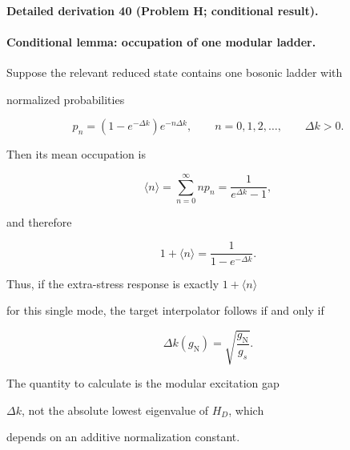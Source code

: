 \label{sec:status-H}



\paragraph{Detailed derivation 40 (Problem H; conditional result).} \label{ref:detail-39} %



\paragraph{Conditional lemma: occupation of one modular ladder.}

Suppose the relevant reduced state contains one bosonic ladder with

normalized probabilities

\[

p_n=(1-e^{-\Delta k})e^{-n\Delta k},

\qquad n=0,1,2,\ldots,\qquad \Delta k>0.

\]

Then its mean occupation is

\[

\langle n\rangle

=

\sum_{n=0}^{\infty} n p_n

=

\frac{1}{e^{\Delta k}-1},

\]

and therefore

\[

1+\langle n\rangle

=

\frac{1}{1-e^{-\Delta k}}.

\]

Thus, if the extra-stress response is exactly \(1+\langle n\rangle\)

for this single mode, the target interpolator follows if and only if

\[

\Delta k(g_{\mathrm N})

=

\sqrt{\frac{g_{\mathrm N}}{g_s}}.

\]

The quantity to calculate is the modular excitation gap

\(\Delta k\), not the absolute lowest eigenvalue of \(H_D\), which

depends on an additive normalization constant.



